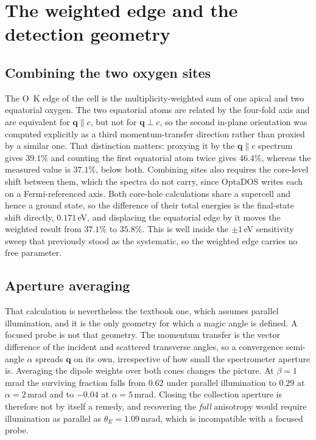 \documentclass[aps,prb,twocolumn,superscriptaddress,floatfix,nofootinbib]{revtex4-2}
\begin{document}
\section{The weighted edge and the detection geometry}
\label{app:geom}

\subsection{Combining the two oxygen sites}

The O~K edge of the cell is the multiplicity-weighted sum of one apical and two equatorial
oxygen. The two equatorial atoms are related by the four-fold axis and are equivalent for
$\mathbf{q}\parallel c$, but not for $\mathbf{q}\perp c$, so the second in-plane orientation was
computed explicitly as a third momentum-transfer direction rather than proxied by a similar one.
That distinction matters: proxying it by the $\mathbf{q}\parallel c$ spectrum gives $39.1\%$ and
counting the first equatorial atom twice gives $46.4\%$, whereas the measured value is $37.1\%$,
below both. Combining sites also requires the core-level shift between them, which the spectra
do not carry, since OptaDOS writes each on a Fermi-referenced axis. Both core-hole calculations
share a supercell and hence a ground state, so the difference of their total energies is the
final-state shift directly, $0.171$\,eV, and displacing the equatorial edge by it moves the
weighted result from $37.1\%$ to $35.8\%$. This is well inside the $\pm1$\,eV sensitivity sweep
that previously stood as the systematic, so the weighted edge carries no free parameter.

\subsection{Aperture averaging}

That calculation is nevertheless the textbook one, which assumes parallel illumination, and it is
the only geometry for which a magic angle is defined. A focused probe is not that geometry. The
momentum transfer is the vector difference of the incident and scattered transverse angles, so a
convergence semi-angle $\alpha$ spreads $\mathbf{q}$ on its own, irrespective of how small the
spectrometer aperture is. Averaging the dipole weights over both cones changes the picture. At
$\beta=1$\,mrad the surviving fraction falls from $0.62$ under parallel illumination to $0.29$ at
$\alpha=2$\,mrad and to $-0.04$ at $\alpha=5$\,mrad. Closing the collection aperture is therefore
not by itself a remedy, and recovering the \emph{full} anisotropy would require illumination as
parallel as $\theta_E=1.09$\,mrad, which is incompatible with a focused probe.
\end{document}
